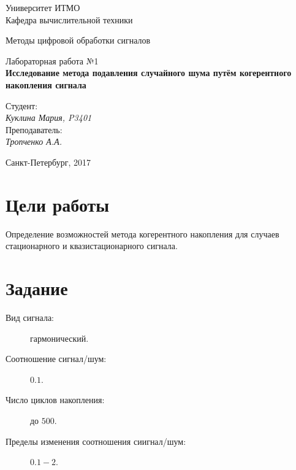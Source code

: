 \documentclass[12pt, a4paper] {ncc}
\begin{document}
\setcounter{figure}{0}
\frenchspacing
\pagestyle{empty}
\begin{center}
							Университет ИТМО	\\
                        Кафедра вычислительной техники

                    Методы цифровой обработки сигналов
\end{center}
\begin{center}
                            Лабораторная работа №1\\
						{\bf Исследование метода подавления случайного шума
							 путём когерентного накопления сигнала}
\end{center}
\begin{flushright}
                                    Студент:\\
                                    {\it Куклина Мария, P3401}\\
									Преподаватель: \\
									{\it Тропченко А.А.}
\end{flushright}
\begin{center}
                             Санкт-Петербург, 2017
\end{center}
\newpage


\section{Цели работы}
    Определение возможностей метода когерентного накопления для случаев стационарного
    и квазистационарного сигнала.
\section{Задание}

    \begin{description}
        \item[Вид сигнала:] гармонический. 
        \item[Соотношение сигнал/шум:] $0.1$.
        \item[Число циклов накопления:] до $500$.
        \item[Пределы изменения соотношения сиигнал/шум:] $0.1-2$.
    \end{description}
\end{document}
